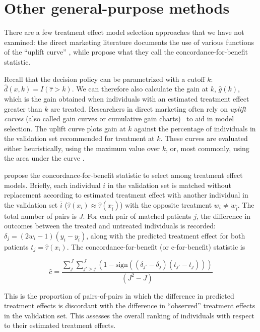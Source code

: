 \section{Other general-purpose methods}

\label{other}

There are a few treatment effect model selection approaches that we have not examined: the direct marketing literature documents the use of various functions of the ``uplift curve'' \cite{Gutierrez:2016tq}, while \citet{vanKlaveren:2018gg} propose what they call the concordance-for-benefit statistic. 

Recall that the decision policy can be parametrized with a cutoff $k$: $\hat d(x,k) = I(\hat\tau>k)$. We can therefore also calculate the gain at $k$, $\hat g(k)$, which is the gain obtained when individuals with an estimated treatment effect greater than $k$ are treated. Researchers in direct marketing often rely on \emph{uplift curves} (also called gain curves or cumulative gain charts) \ to aid in model selection. The uplift curve plots gain at $k$ against the percentage of individuals in the validation set recommended for treatment at $k$. These curves are evaluated either heuristically, using the maximum value over $k$, or, most commonly, using the area under the curve \cite{Gutierrez:2016tq}.

\citet{vanKlaveren:2018gg} propose the concordance-for-benefit statistic to select among treatment effect models. Briefly, each individual $i$ in the validation set is matched without replacement according to estimated treatment effect with another individual in the validation set $\bar{i}$ ($\hat\tau(x_i) \approx \hat\tau(x_{\bar i})$) with the opposite treatment $w_i \ne w_{\bar i}$. The total number of pairs is $J$. For each pair of matched patients $j$, the difference in outcomes between the treated and untreated individuals is recorded: $\delta_j = (2w_i - 1)(y_i -y_{\bar i})$, along with the predicted treatment effect for both patients $t_j = \hat\tau(x_i)$. The concordance-for-benefit (or c-for-benefit) statistic is

\[
\hat c = \frac{\sum_j^J \sum_{j' > j}^J (1 - \text{sign}((\delta_{j'} - \delta_j)(t_{j'} - t_j))) }{(J^2-J)}
\]

This is the proportion of pairs-of-pairs in which the difference in predicted treatment effects is discordant with the difference in ``observed'' treatment effects in the validation set. This assesses the overall ranking of individuals with respect to their estimated treatment effects.

